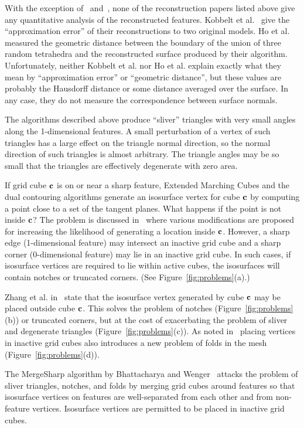 With the exception of~\cite{hwco-cmsaf-05} and~\cite{kbsh-fssev-01},
none of the reconstruction papers listed above give any quantitative
analysis of the reconstructed features.
Kobbelt et al.~\cite{kbsh-fssev-01} give the ``approximation error''
of their reconstructions to two original models.
Ho et al.~\cite{hwco-cmsaf-05} measured the geometric distance
between the boundary of the union of three random tetrahedra and 
the reconstructed surface produced by their algorithm.
Unfortunately, neither Kobbelt et al. nor Ho et al. explain
exactly what they mean by ``approximation error'' or ``geometric distance'',
but these values are probably the Hausdorff distance 
or some distance averaged over the surface.
In any case, they do not measure the correspondence 
between surface normals.

The algorithms described above 
produce ``sliver'' triangles with very small angles 
along the 1-dimensional features.
A small perturbation of a vertex of such triangles
has a large effect on the triangle normal direction,
so the normal direction of such triangles is almost arbitrary.
The triangle angles may be so small that the triangles are effectively
degenerate with zero area.

If grid cube $\mathbf{c}$ is on or near a sharp feature,
Extended Marching Cubes and the dual contouring algorithms
generate an isosurface vertex for cube $\mathbf{c}$
by computing a point close to a set of the tangent planes.
What happens if the point is not inside $\mathbf{c}$?
The problem is discussed in~\cite{sw-dcss-02}
where various modifications are proposed for increasing the likelihood
of generating a location inside $\mathbf{c}$.
However, a sharp edge (1-dimensional feature) may intersect 
an inactive grid cube  and a sharp corner (0-dimensional feature) 
may lie in an inactive grid cube.
In such cases, if isosurface vertices are required to lie within active cubes,
the isosurfaces will contain notches or truncated corners.
(See Figure~\ref{fig:problems}(a).)

Zhang et al. in~\cite{zhk-dctps-04} state that the isosurface vertex
generated by cube $\mathbf{c}$ may be placed outside cube $\mathbf{c}$.
This solves the problem of notches (Figure~\ref{fig:problems}(b))
or truncated corners,
but at the cost of exacerbating the problem 
of sliver and degenerate triangles (Figure~\ref{fig:problems}(c)).
As noted in~\cite{sw-dcss-02}
placing vertices in inactive grid cubes also introduces a new problem
of folds in the mesh (Figure~\ref{fig:problems}(d)).

The MergeSharp algorithm by Bhattacharya and Wenger~\cite{bw-cisec-13,bw-erm-13}
attacks the problem of sliver triangles, notches, and folds
by merging grid cubes around features
so that isosurface vertices on features are well-separated 
from each other and from non-feature vertices.
Isosurface vertices are permitted to be placed in inactive grid cubes.

